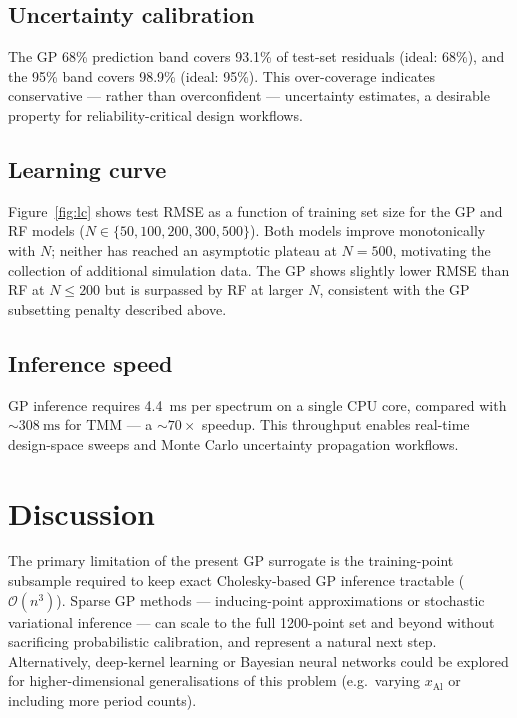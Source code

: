 \documentclass[9pt,twocolumn]{optica-article}
\begin{document}
\subsection{Uncertainty calibration}

The GP 68\% prediction band covers 93.1\% of test-set residuals (ideal: 68\%), and
the 95\% band covers 98.9\% (ideal: 95\%).
This over-coverage indicates conservative — rather than overconfident — uncertainty
estimates, a desirable property for reliability-critical design workflows.

\subsection{Learning curve}

Figure~\ref{fig:lc} shows test RMSE as a function of training set size for the GP
and RF models ($N\in\{50,100,200,300,500\}$).
Both models improve monotonically with $N$; neither has reached an asymptotic plateau
at $N=500$, motivating the collection of additional simulation data.
The GP shows slightly lower RMSE than RF at $N\leq200$ but is surpassed by RF at
larger $N$, consistent with the GP subsetting penalty described above.

\subsection{Inference speed}

GP inference requires \SI{4.4}{\milli\second} per spectrum on a single CPU core,
compared with ${\sim}\SI{308}{\milli\second}$ for TMM — a ${\sim}70\times$ speedup.
This throughput enables real-time design-space sweeps and Monte Carlo uncertainty
propagation workflows.


\section{Discussion}

The primary limitation of the present GP surrogate is the training-point subsample
required to keep exact Cholesky-based GP inference tractable ($\mathcal{O}(n^3)$).
Sparse GP methods — inducing-point approximations \cite{Quinonero2005} or
stochastic variational inference \cite{Hensman2013} — can scale to the full 1200-point
set and beyond without sacrificing probabilistic calibration, and represent a
natural next step.
Alternatively, deep-kernel learning \cite{Wilson2016} or Bayesian neural networks
could be explored for higher-dimensional generalisations of this problem (e.g.\
varying $x_\mathrm{Al}$ or including more period counts).
\end{document}
